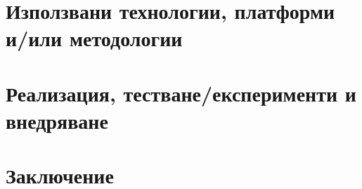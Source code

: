 \documentclass[a4paper,12pt]{article}
\begin{document}
\section{Използвани технологии, платформи и/или методологии}


\section{Реализация, тестване/експерименти и внедряване}

\section{Заключение}

\printbibliography[title={Използвана литература}]
\end{document}
